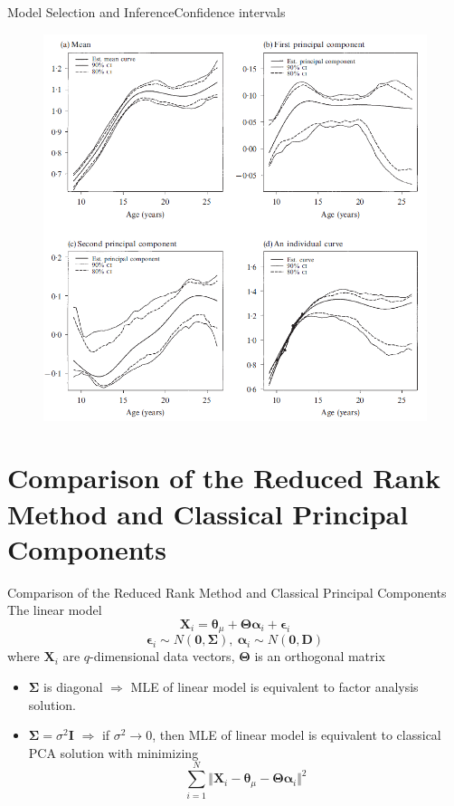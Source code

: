 \documentclass{beamer}
\def \bX {\mathbf{X}}
\def \btheta {\boldsymbol{\theta}}
\def \bTheta {\boldsymbol{\Theta}}
\def \bepsilon {\boldsymbol{\epsilon}}
\def \balpha {\boldsymbol{\alpha}}
\begin{document}
\begin{frame}{Model Selection and Inference}{Confidence intervals}
	\begin{figure}[h] %
		\begin{center}
			\includegraphics[width=0.6\linewidth]{img/10.png}
		\end{center}
		\label{fig:long}
		\label{fig:onecol}
	\end{figure}
\end{frame}


\section{Comparison of the Reduced Rank Method and Classical Principal Components}
\begin{frame}{Comparison of the Reduced Rank Method and Classical Principal Components}
	The linear model
	$$ \bX_i = \btheta_{\mu}+\bTheta\balpha_i + \bepsilon_i $$
	$$ \bepsilon_i \sim N(\mathbf{0}, \mathbf{\Sigma}), \ \balpha_i \sim N(\mathbf{0},\mathbf{D}) $$
	where $\bX_i$ are $q$-dimensional data vectors, $\bTheta$ is an orthogonal matrix
	\begin{itemize}
		\item {
			$\mathbf{\Sigma}$ is diagonal $\Rightarrow$ MLE of linear model is equivalent to factor analysis solution.
		}
		\item {
			$\mathbf{\Sigma}=\sigma^2 \mathbf{I}$ $\Rightarrow$ if $\sigma^2 \rightarrow 0$, then MLE of linear model is equivalent to classical PCA solution with minimizing
			$$ \sum_{i=1}^N \Vert \bX_i - \btheta_{\mu}-\bTheta\balpha_i \Vert^2  $$
		}
	\end{itemize}
\end{frame}
\end{document}
